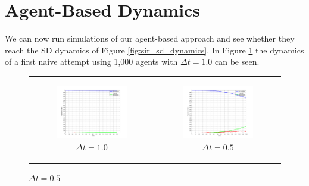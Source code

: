 \section{Agent-Based Dynamics}
We can now run simulations of our agent-based approach and see whether they reach the SD dynamics of Figure \ref{fig:sir_sd_dynamics}. In Figure \ref{fig:sir_abs_approximating_1dt} the dynamics of a first naive attempt using 1,000 agents with $\Delta t= 1.0$ can be seen. 

\begin{figure}
\begin{center}
	\begin{tabular}{c c}
		\begin{subfigure}[b]{0.3\textwidth}
			\centering
			\includegraphics[width=1\textwidth, angle=0]{./../shared/fig/frabs/SIR_1000agents_150t_1dt_NOSS_parallel.png}
			\caption{$\Delta t = 1.0$}
			\label{fig:sir_abs_approximating_1dt}
		\end{subfigure}
    	&
		\begin{subfigure}[b]{0.3\textwidth}
			\centering
			\includegraphics[width=1\textwidth, angle=0]{./../shared/fig/frabs/SIR_1000agents_150t_05dt_NOSS_parallel.png}
			\caption{$\Delta t = 0.5$}
			\label{fig:sir_abs_approximating_05dt}
		\end{subfigure}
    	

\end{tabular}
\end{center}
\end{figure}
